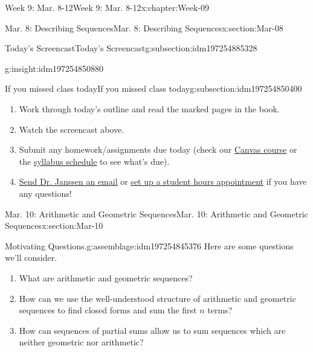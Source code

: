 \documentclass[oneside,10pt,]{book}
\numberwithin{equation}{section}
\begin{document}
\begin{chapterptx}{Week 9: Mar. 8-12}{}{Week 9: Mar. 8-12}{}{}{x:chapter:Week-09}
\begin{sectionptx}{Mar. 8: Describing Sequences}{}{Mar. 8: Describing Sequences}{}{}{x:section:Mar-08}
\begin{subsectionptx}{Today's Screencast}{}{Today's Screencast}{}{}{g:subsection:idm197254885328}
\begin{insight}{}{g:insight:idm197254850880}
\begin{tcbraster}[raster columns=2, raster column skip=1pt, raster halign=center, raster force size=false, raster left skip=0pt, raster right skip=0pt]
\begin{tcolorbox}[qrstyle]%
[QR LINK]\end{tcolorbox}%
\end{tcbraster}%
\end{insight}
\end{subsectionptx}
%
%
\typeout{************************************************}
\typeout{************************************************}
%
\begin{subsectionptx}{If you missed class today}{}{If you missed class today}{}{}{g:subsection:idm197254850400}
%
\begin{enumerate}
\item{}Work through today's outline and read the marked pages in the book.%
\item{}Watch the screencast above.%
\item{}Submit any homework\slash{}assignments due today (check our \href{https://dordt.instructure.com/courses/3110050}{Canvas course} or the \href{https://prof.mkjanssen.org/ds/index.html\#schedule}{syllabus schedule} to see what's due).%
\item{}\href{mailto:mike.janssen@dordt.edu}{Send Dr. Janssen an email} or \href{https://calendly.com/mkjanssen/student-hours}{set up a student hours appointment} if you have any questions!%
\end{enumerate}
\end{subsectionptx}
\end{sectionptx}
%
%
\typeout{************************************************}
\typeout{************************************************}
%
\begin{sectionptx}{Mar. 10: Arithmetic and Geometric Sequences}{}{Mar. 10: Arithmetic and Geometric Sequences}{}{}{x:section:Mar-10}
\begin{introduction}{}%
\begin{assemblage}{Motivating Questions.}{g:assemblage:idm197254845376}%
Here are some questions we'll consider. %
\begin{enumerate}
\item{}What are arithmetic and geometric sequences?%
\item{}How can we use the well-understood structure of arithmetic and geometric sequences to find closed forms and sum the first \(n\) terms?%
\item{}How can sequences of partial sums allow us to sum sequences which are neither geometric nor arithmetic?%

\end{enumerate}
\end{assemblage}
\end{introduction}
\end{sectionptx}
\end{chapterptx}
\end{document}
